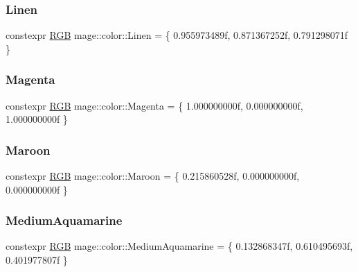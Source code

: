 \subsubsection{\texorpdfstring{Linen}{Linen}}
{\footnotesize\ttfamily constexpr \hyperlink{structmage_1_1_r_g_b}{R\+GB} mage\+::color\+::\+Linen = \{ 0.\+955973489f, 0.\+871367252f, 0.\+791298071f \}}

\hypertarget{namespacemage_1_1color_ace3bc5380195732597310bea2764a6bd}{}\label{namespacemage_1_1color_ace3bc5380195732597310bea2764a6bd} 
\subsubsection{\texorpdfstring{Magenta}{Magenta}}
{\footnotesize\ttfamily constexpr \hyperlink{structmage_1_1_r_g_b}{R\+GB} mage\+::color\+::\+Magenta = \{ 1.\+000000000f, 0.\+000000000f, 1.\+000000000f \}}

\hypertarget{namespacemage_1_1color_a6573b86c7e6c8c7cbf76c108a5820259}{}\label{namespacemage_1_1color_a6573b86c7e6c8c7cbf76c108a5820259} 
\subsubsection{\texorpdfstring{Maroon}{Maroon}}
{\footnotesize\ttfamily constexpr \hyperlink{structmage_1_1_r_g_b}{R\+GB} mage\+::color\+::\+Maroon = \{ 0.\+215860528f, 0.\+000000000f, 0.\+000000000f \}}

\hypertarget{namespacemage_1_1color_a4560188b77c7b4a82162c749b9e4e5f6}{}\label{namespacemage_1_1color_a4560188b77c7b4a82162c749b9e4e5f6} 
\subsubsection{\texorpdfstring{Medium\+Aquamarine}{MediumAquamarine}}
{\footnotesize\ttfamily constexpr \hyperlink{structmage_1_1_r_g_b}{R\+GB} mage\+::color\+::\+Medium\+Aquamarine = \{ 0.\+132868347f, 0.\+610495693f, 0.\+401977807f \}}

\hypertarget{namespacemage_1_1color_a0be5a1c37d2e0598414235399e0cb6e2}{}\label{namespacemage_1_1color_a0be5a1c37d2e0598414235399e0cb6e2} 
